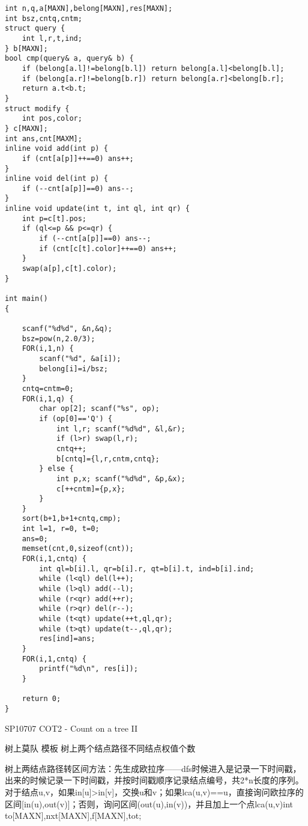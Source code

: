 \begin{lstlisting}
int n,q,a[MAXN],belong[MAXN],res[MAXN];
int bsz,cntq,cntm;
struct query {
    int l,r,t,ind;
} b[MAXN];
bool cmp(query& a, query& b) {
    if (belong[a.l]!=belong[b.l]) return belong[a.l]<belong[b.l];
    if (belong[a.r]!=belong[b.r]) return belong[a.r]<belong[b.r];
    return a.t<b.t;
}
struct modify {
    int pos,color;
} c[MAXN];
int ans,cnt[MAXM];
inline void add(int p) {
    if (cnt[a[p]]++==0) ans++;
}
inline void del(int p) {
    if (--cnt[a[p]]==0) ans--;
}
inline void update(int t, int ql, int qr) {
    int p=c[t].pos;
    if (ql<=p && p<=qr) {
        if (--cnt[a[p]]==0) ans--;
        if (cnt[c[t].color]++==0) ans++;
    }
    swap(a[p],c[t].color);
}

int main()
{

    scanf("%d%d", &n,&q);
    bsz=pow(n,2.0/3);
    FOR(i,1,n) {
        scanf("%d", &a[i]);
        belong[i]=i/bsz;
    }
    cntq=cntm=0;
    FOR(i,1,q) {
        char op[2]; scanf("%s", op);
        if (op[0]=='Q') {
            int l,r; scanf("%d%d", &l,&r);
            if (l>r) swap(l,r);
            cntq++;
            b[cntq]={l,r,cntm,cntq};
        } else {
            int p,x; scanf("%d%d", &p,&x);
            c[++cntm]={p,x};
        }
    }
    sort(b+1,b+1+cntq,cmp);
    int l=1, r=0, t=0;
    ans=0;
    memset(cnt,0,sizeof(cnt));
    FOR(i,1,cntq) {
        int ql=b[i].l, qr=b[i].r, qt=b[i].t, ind=b[i].ind;
        while (l<ql) del(l++);
        while (l>ql) add(--l);
        while (r<qr) add(++r);
        while (r>qr) del(r--);
        while (t<qt) update(++t,ql,qr);
        while (t>qt) update(t--,ql,qr);
        res[ind]=ans;
    }
    FOR(i,1,cntq) {
        printf("%d\n", res[i]);
    }

    return 0;
}
\end{lstlisting}

SP10707 COT2 - Count on a tree II

树上莫队 模板 树上两个结点路径不同结点权值个数

树上两结点路径转区间方法：先生成欧拉序——dfs时候进入是记录一下时间戳，出来的时候记录一下时间戳，并按时间戳顺序记录结点编号，共2*n长度的序列。对于结点u,v，如果in[u]>in[v]，交换u和v；如果lca(u,v)==u，直接询问欧拉序的区间[in(u),out(v)]；否则，询问区间(out(u),in(v))，并且加上一个点lca(u,v)int to[MAXN],nxt[MAXN],f[MAXN],tot;

